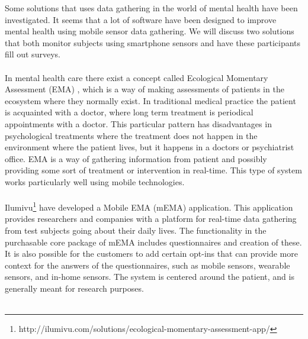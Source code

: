 Some solutions that uses data gathering in the world of mental health have been investigated. It seems that a lot of software have been designed to improve mental health using mobile sensor data gathering. We will discuss two solutions that both monitor subjects using smartphone sensors and have these participants fill out surveys. 
\\\\
In mental health care there exist a concept called Ecological Momentary Assessment (EMA) \parencite{shiffman2008ecological}, which is a way of making assessments of patients in the ecosystem where they normally exist. In traditional medical practice the patient is acquainted with a doctor, where long term treatment is periodical appointments with a doctor. This particular pattern has disadvantages in psychological treatments where the treatment does not happen in the environment where the patient lives, but it happens in a doctors or psychiatrist office. EMA is a way of gathering information from patient and possibly providing some sort of treatment or intervention in real-time. This type of system works particularly well using mobile technologies.
\\\\
Ilumivu\footnote{http://ilumivu.com/solutions/ecological-momentary-assessment-app/} have developed a Mobile EMA (mEMA) application. This application provides researchers and companies with a platform for real-time data gathering from test subjects going about their daily lives. The functionality in the purchasable core package of mEMA includes questionnaires and creation of these. It is also possible for the customers to add certain opt-ins that can provide more context for the answers of the questionnaires, such as mobile sensors, wearable sensors, and in-home sensors. The system is centered around the patient, and is generally meant for research purposes.
\\\\
